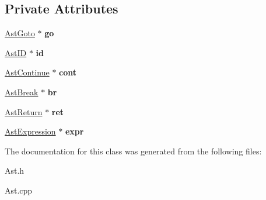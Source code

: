 \subsection*{Private Attributes}
\begin{DoxyCompactItemize}
\item 
\hypertarget{classAstJump_a8abdf72a491679a37b85722e5232f3eb}{\hyperlink{classAstGoto}{Ast\-Goto} $\ast$ {\bfseries go}}\label{classAstJump_a8abdf72a491679a37b85722e5232f3eb}

\item 
\hypertarget{classAstJump_aeacd0443e8d2b30d95971ffd619e9771}{\hyperlink{classAstID}{Ast\-I\-D} $\ast$ {\bfseries id}}\label{classAstJump_aeacd0443e8d2b30d95971ffd619e9771}

\item 
\hypertarget{classAstJump_a63dd01803ffd6c0435b1d98874af61dd}{\hyperlink{classAstContinue}{Ast\-Continue} $\ast$ {\bfseries cont}}\label{classAstJump_a63dd01803ffd6c0435b1d98874af61dd}

\item 
\hypertarget{classAstJump_ae38078936f9880c3deef5bebdb1d509d}{\hyperlink{classAstBreak}{Ast\-Break} $\ast$ {\bfseries br}}\label{classAstJump_ae38078936f9880c3deef5bebdb1d509d}

\item 
\hypertarget{classAstJump_a458eaa8d819ef1f32f571ec2580b0ff6}{\hyperlink{classAstReturn}{Ast\-Return} $\ast$ {\bfseries ret}}\label{classAstJump_a458eaa8d819ef1f32f571ec2580b0ff6}

\item 
\hypertarget{classAstJump_ad7d1077d5ea38bff0b774d3cea6a10c1}{\hyperlink{classAstExpression}{Ast\-Expression} $\ast$ {\bfseries expr}}\label{classAstJump_ad7d1077d5ea38bff0b774d3cea6a10c1}

\end{DoxyCompactItemize}


The documentation for this class was generated from the following files\-:\begin{DoxyCompactItemize}
\item 
Ast.\-h\item 
Ast.\-cpp\end{DoxyCompactItemize}
